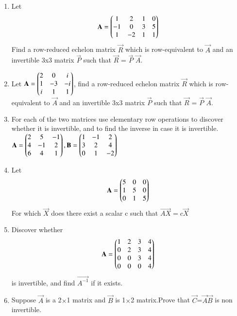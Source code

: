 \renewcommand{\theequation}{\theenumi}
\renewcommand{\thefigure}{\theenumi}
\begin{enumerate}[label=\thesubsection.\arabic*.,ref=\thesubsection.\theenumi]
%
\item Let
\begin{align}
\mathbf{A}=\begin{pmatrix}1&2&1&0\\-1&0&3&5\\1&-2&1&1\end{pmatrix}  
\end{align}
Find a row-reduced echelon matrix $\vec{R}$ which is row-equivalent to $\vec{A}$ and an invertible 3x3 matrix $\vec{P}$ such that $\vec{R}$ = $\vec{P}$ $\vec{A}$.
%
%
\solution

\item Let $\mathbf{A}= \begin{pmatrix}2 & 0 & i \\ 1 & -3 & -i \\ i & 1 &  1\end{pmatrix}$, find a row-reduced echelon matrix $\vec{R}$ which is row-equivalent to $\vec{A}$ and an invertible 3x3 matrix $\vec{P}$ such that $\vec{R}$ = $\vec{P}$ $\vec{A}$.
%
\solution

%
\item For each of the two matrices use elementary row operations to discover whether it is invertible, and to find the inverse in case it is invertible.\\

$\mathbf{A}=\begin{pmatrix}2&5&-1\\4&-1&2\\6&4&1\end{pmatrix},
\mathbf{B}=\begin{pmatrix}1&-1&2\\3&2&4\\0&1&-2\end{pmatrix}$
%
\\
%
\solution

\item Let 
\begin{align}
	\mathbf{A} = \begin{pmatrix}5 & 0 & 0\\1 & 5 & 0\\0 & 1 & 5\end{pmatrix}
\end{align}
For which $\vec{X}$ does there exist a scalar c such that $\vec{AX} = c \vec{X}$
%
\\
%
\solution

\item Discover whether
\begin{align}
	\mathbf{A}=\begin{pmatrix} 1 & 2 & 3 & 4 \\
			0 & 2 & 3 & 4 \\
			0 & 0 & 3 & 4 \\
			0 & 0 & 0 & 4\end{pmatrix}
\end{align}
is invertible, and find $\vec{A^{-1}}$ if it exists.
\\
%
\solution

%
\item Suppose $\vec{A}$ is a 2$\times$1  matrix and $\vec{B}$ is 1$\times$2 matrix.Prove that $\vec{C}$=$\vec{A}$$\vec{B}$ is non invertible.


\end{enumerate}
